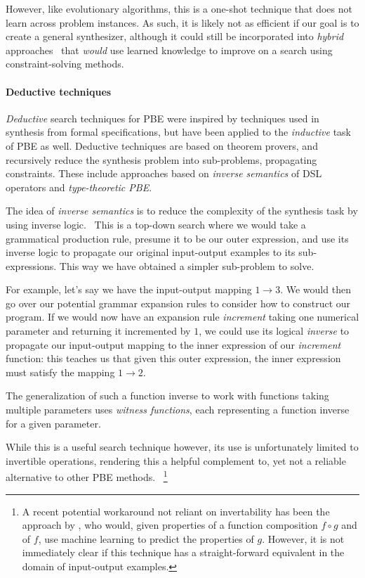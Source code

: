 \documentclass{article}
\begin{document}
However, like evolutionary algorithms, this is a one-shot technique
that does not learn across problem instances.
As such, it is likely not as efficient if our goal is to create a general synthesizer,
although it could still be incorporated into \emph{hybrid} approaches~\citep{deepcoder} that \emph{would} use learned knowledge to improve on a search using constraint-solving methods.

\paragraph{Deductive techniques}

\emph{Deductive} search techniques for PBE were inspired by
techniques used in synthesis from formal specifications,
but have been applied to the \emph{inductive} task of PBE as well.
Deductive techniques are based on theorem provers,
and recursively reduce the synthesis problem into sub-problems,
propagating constraints.
These include approaches based on \emph{inverse semantics} of
DSL operators and \emph{type-theoretic PBE}.


The idea of \emph{inverse semantics} is to reduce the complexity
of the synthesis task by using inverse logic.~\citep{flashmeta,prose}
This is a top-down search where we would take a grammatical
production rule, presume it to be our outer expression,
and use its inverse logic to propagate our original
input-output examples to its sub-expressions.
This way we have obtained a simpler sub-problem to solve.

For example, let's say we have the input-output mapping $1 \rightarrow 3$.
We would then go over our potential grammar expansion rules to consider how to construct our program.
If we would now have an expansion rule \emph{increment} taking one numerical parameter and returning it incremented by $1$,
we could use its logical \emph{inverse} to propagate our input-output mapping to the inner expression of our \emph{increment} function:
this teaches us that given this outer expression,
the inner expression must satisfy the mapping $1 \rightarrow 2$.

The generalization of such a function inverse to work with functions
taking multiple parameters uses \emph{witness functions},
each representing a function inverse for a given parameter.

While this is a useful search technique however, its
use is unfortunately limited to invertible operations,
rendering this a helpful complement to, yet not a
reliable alternative to other PBE methods.%
~\footnote{
    A recent potential workaround not reliant on invertability
    has been the approach by \citet{odena2020learning},
    who would, given properties of a function composition
    $f \circ g$ and of $f$, use machine learning to predict
    the properties of $g$.
    However, it is not immediately clear if this technique
    has a straight-forward equivalent in the domain of
    input-output examples.
}
\end{document}
